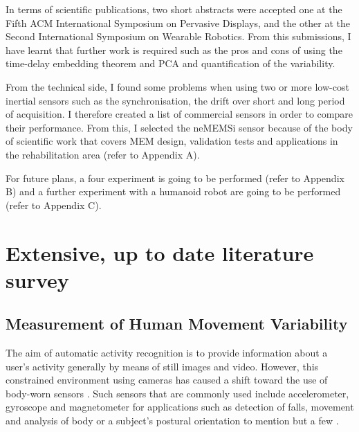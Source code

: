 \documentclass[9pt,journal,onecolumn,compsoc]{IEEEtran}
\begin{document}
In terms of scientific publications, two short abstracts were accepted one at
the Fifth ACM International Symposium on Pervasive Displays, and 
the other at the Second International Symposium on Wearable Robotics.
From this submissions, I have learnt that further work is 
required such as the pros and cons of using the time-delay embedding theorem and PCA
and quantification of the variability.

From the technical side, I found some problems when using two or more 
low-cost inertial sensors such as the synchronisation, the drift over short and long period of acquisition.
I therefore created a list of commercial sensors in order to compare their performance.
From this, I selected the neMEMSi sensor because of the body of scientific work that covers
MEM design, validation tests and applications in the rehabilitation area (refer to Appendix A).


For future plans, a four experiment is going to be performed (refer to Appendix B)
and a further experiment with a humanoid robot are going to be performed (refer to Appendix C).


\appendices

\section{Extensive, up to date literature survey}

\subsection{Measurement of Human Movement Variability}

The aim of automatic activity recognition is to provide information about a user's activity
generally by means of still images and video. 
However, this constrained environment using cameras has caused a shift toward 
the use of body-worn sensors \cite{bulling2014}. Such sensors that are commonly used 
include accelerometer, gyroscope and magnetometer for applications such as detection of falls, 
movement and analysis of body or a subject's postural orientation to mention but a few \cite{Mukhopadhyay2014}.
\end{document}
